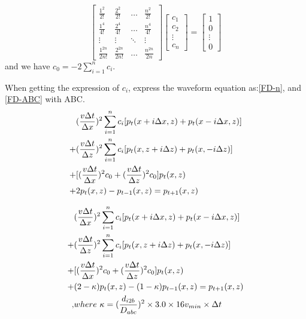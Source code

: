 \documentclass[a4paper]{article}
\begin{document}
		\begin{equation}
			\begin{bmatrix}
				\frac{1^2}{2!} & \frac{2^2}{2!} & \ldots & \frac{n^2}{2!}\\
				\frac{1^4}{4!} & \frac{2^4}{4!} & \ldots & \frac{n^4}{4!}\\
				\vdots & \vdots & \ddots & \vdots\\
				\frac{1^{2n}}{2n!} & \frac{2^{2n}}{2n!} & \ldots & \frac{n^{2n}}{2n}
			\end{bmatrix}
			\begin{bmatrix}
				 c_1\\c_2\\\vdots\\c_n
			\end{bmatrix}
			=
			\begin{bmatrix}
				 1\\0\\\vdots\\0
			\end{bmatrix}
			\label{n-order}
		\end{equation}
		 and we have $c_0=-2 \sum_{i=1}^{n}c_i$.

		When getting the expression of \textbf{$c_i$}, express the waveform equation as:\autoref{FD-n}, and \autoref{FD-ABC} with ABC.
		\begin{align}
			&(\frac{v\Delta t}{\Delta x})^2\sum_{i=1}^n c_i[p_t(x+i\Delta x,z)+p_t(x-i\Delta x, z)] \notag\\
			+&(\frac{v\Delta t}{\Delta z})^2\sum_{i=1}^n c_i[p_t(x, z+i\Delta z)+p_t(x, -i\Delta z)] \notag\\
			+&[(\frac{v\Delta t}{\Delta x})^2c_0+(\frac{v\Delta t}{\Delta z})^2c_0]p_t(x,z)\notag\\
			+&2p_t(x,z)-p_{t-1}(x,z)=p_{t+1}(x,z)
			\label{FD-n}
		\end{align}

		\begin{align}
			&(\frac{v\Delta t}{\Delta x})^2\sum_{i=1}^n c_i[p_t(x+i\Delta x,z)+p_t(x-i\Delta x, z)] \notag\\
			+&(\frac{v\Delta t}{\Delta z})^2\sum_{i=1}^n c_i[p_t(x, z+i\Delta z)+p_t(x, -i\Delta z)] \notag\\
			+&[(\frac{v\Delta t}{\Delta x})^2c_0+(\frac{v\Delta t}{\Delta z})^2c_0]p_t(x,z)\notag\\
			+&(2-\kappa)p_t(x,z)-(1-\kappa)p_{t-1}(x,z)=p_{t+1}(x,z) \notag\\
			,&where\ \kappa=(\frac{d_{i2b}}{D_{abc}})^2\times 3.0 \times  16 v_{min}\times \Delta t 
			\label{FD-ABC}			
		\end{align}
\end{document}
